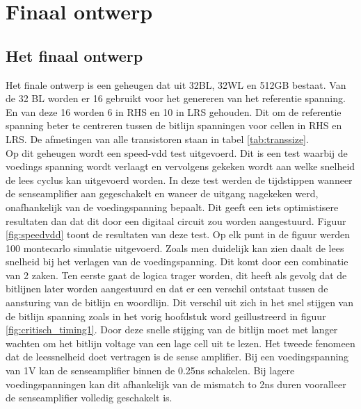 \chapter{Finaal ontwerp}
\label{final}
\section{Het finaal ontwerp}
Het finale ontwerp is een geheugen dat uit 32BL, 32WL en 512GB bestaat. Van de 32 BL worden er 16 gebruikt voor het genereren van het referentie spanning. En van deze 16 worden 6 in RHS en 10 in LRS gehouden. Dit om de referentie spanning beter te centreren tussen de bitlijn spanningen voor cellen in RHS en LRS. De afmetingen van alle transistoren staan in tabel \ref{tab:transsize}. \\
Op dit geheugen wordt een speed-vdd test uitgevoerd. Dit is een test waarbij de voedings spanning wordt verlaagt en vervolgens gekeken wordt aan welke snelheid de lees cyclus kan uitgevoerd worden. In deze test werden de tijdstippen wanneer de senseamplifier aan gegeschakelt en waneer de uitgang nagekeken werd, onafhankelijk van de voedingspanning bepaalt. Dit geeft een iets optimistisere resultaten dan dat dit door een digitaal circuit zou worden aangestuurd. Figuur \ref{fig:speedvdd} toont de resultaten van deze test. Op elk punt in de figuur werden 100 montecarlo simulatie uitgevoerd. Zoals men duidelijk kan zien  daalt de lees snelheid bij het verlagen van de voedingspanning. Dit komt door een combinatie van 2 zaken. Ten eerste gaat de logica trager worden, dit heeft als gevolg dat de bitlijnen later worden aangestuurd en dat er een verschil ontstaat tussen de aansturing van de bitlijn en woordlijn. Dit verschil uit zich in het snel stijgen van de bitlijn spanning zoals in het vorig hoofdstuk word geillustreerd in figuur \ref{fig:critisch_timing1}. Door deze snelle stijging van de bitlijn moet met langer wachten om het bitlijn voltage van een lage cell uit te lezen. Het tweede fenomeen dat de leessnelheid doet vertragen is de sense amplifier. Bij een voedingspanning van 1V kan de senseamplifier binnen de 0.25ns schakelen. Bij lagere voedingspanningen kan dit afhankelijk van de mismatch to 2ns duren vooralleer de senseamplifier volledig geschakelt is.

